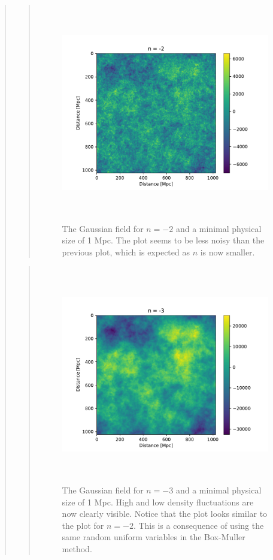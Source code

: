 \begin{quote}
\begin{quote}
\begin{figure}[!ht]
\centering
\includegraphics[width=14cm, height=9.5cm]{./Plots/2_field_-2.pdf}
\caption{The Gaussian field for $n = -2$ and a minimal physical size of 1 Mpc. The plot seems to be less noisy than the previous plot, which is expected as $n$ is now smaller.  }
\end{figure}
\end{quote}

\newpage
\begin{quote}

\begin{figure}[!ht]
\centering
\includegraphics[width=14cm, height=9.5cm]{./Plots/2_field_-3.pdf}
\caption{The Gaussian field for $n = -3$ and a minimal physical size of 1 Mpc. High and low density fluctuations are now clearly visible. Notice that the plot looks similar to the plot for $n = -2 $. This is a consequence of using the same random uniform variables in the Box-Muller method. }
\end{figure}
\end{quote}



\end{quote}








